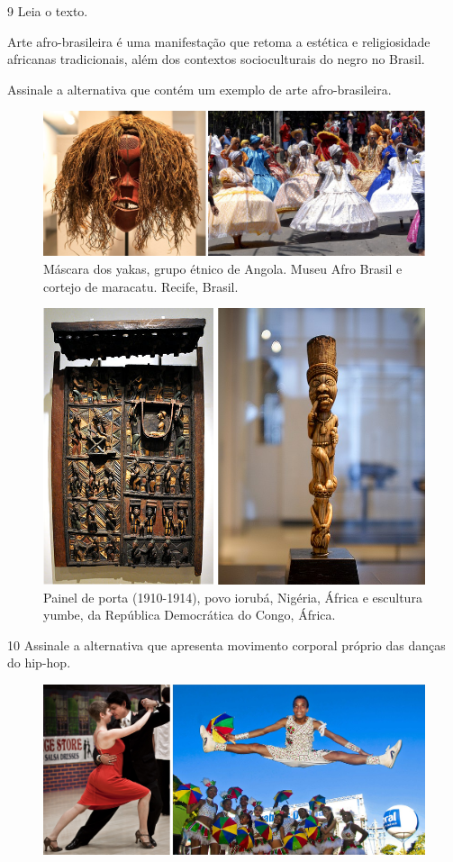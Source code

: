 \num{9}  Leia o texto.

Arte afro-brasileira é uma manifestação que retoma a estética e religiosidade africanas tradicionais, além dos contextos socioculturais do negro no Brasil.

Assinale a alternativa que contém um exemplo de arte afro-brasileira.

\begin{figure}[htpb!]
\includegraphics[width=.7\textwidth]{./imgs/art34ab.png}
\caption{Máscara dos yakas, grupo étnico de Angola. Museu Afro Brasil e cortejo de maracatu. Recife, Brasil.}
\end{figure}

\begin{figure}[htpb!]
\includegraphics[width=.7\textwidth]{./imgs/art34cd.png}
\caption{Painel de porta (1910-1914), povo iorubá, Nigéria, África e escultura yumbe, da República Democrática do Congo, África.}
\end{figure}



\num{10} Assinale a alternativa que apresenta movimento corporal próprio das danças do hip-hop.

\begin{figure}[htpb!]
\includegraphics[width=.7\textwidth]{./imgs/art35ab.png}
\end{figure}


